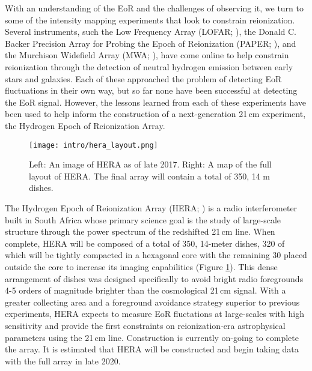 With an understanding of the EoR and the challenges of observing it, we turn to
some of the intensity mapping experiments that look to constrain reionization. Several
instruments, such the Low Frequency Array (LOFAR; \cite{2013A&A...550A.136Y}), the Donald C. Backer Precision Array
for Probing the Epoch of Reionization (PAPER; \cite{2010AJ....139.1468P}), and the Murchison Widefield Array (MWA; \cite{2013PASA...30....7T}),
have come online to help constrain reionization through the detection of
neutral hydrogen emission between early stars and galaxies. Each of these approached the problem of detecting
EoR fluctuations in their own way, but so far none have been successful at
detecting the EoR signal. However, the lessons learned from each of these experiments
have been used to help inform the construction of a next-generation 21\,cm experiment,
the Hydrogen Epoch of Reionization Array.

\begin{figure}[ht]
	\centering
	\texttt{[image: intro/hera\_layout.png]}
	\caption[HERA Image and Layout]{Left: An image of HERA as of late 2017. Right: A map of
					 the full layout of HERA. The final array will contain a total of 350, 14 m dishes.}
	\label{fig:hera_layout}
\end{figure}

The Hydrogen Epoch of Reionization Array (HERA; \cite{2017PASP..129d5001D}) is
a radio interferometer built in South Africa whose primary science goal is
the study of large-scale structure through the power spectrum of the redshifted 21\,cm
line. When complete, HERA will be composed of a total of 350, 14-meter dishes, 320
of which will be tightly compacted in a hexagonal core with the remaining 30 placed
outside the core to increase its imaging capabilities (Figure \ref{fig:hera_layout}). This dense arrangement of
dishes was designed specifically to avoid bright radio foregrounds 4-5 orders of
magnitude brighter than the cosmological 21\,cm signal. With a greater collecting
area and a foreground avoidance strategy superior to previous experiments, HERA
expects to measure EoR fluctations at large-scales with high sensitivity and
provide the first constraints on reionization-era astrophysical parameters using
the 21\,cm line. Construction is currently on-going to complete the array. It is estimated
that HERA will be constructed and begin taking data with the full array in late 2020.
